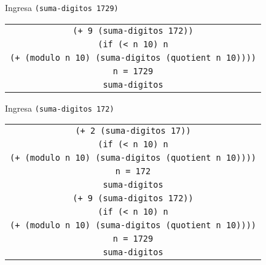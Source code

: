\documentclass[letterpaper,11pt]{article}
\begin{document}
\begin{enumerate}
\begin{enumerate}
        Ingresa \texttt{(suma-digitos 1729)}
        \begin{center}
            \begin{tabular}[h]{|c|}
                \hline
                \texttt{(+ 9 (suma-digitos 172))} \\
                \texttt{(if (< n 10) n} \\
                \texttt{(+ (modulo n 10) (suma-digitos (quotient n 10))))} \\ 
                \texttt{n = 1729} \\
                \texttt{suma-digitos} \\
                \hline
            \end{tabular}
        \end{center}

        Ingresa \texttt{(suma-digitos 172)}
        \begin{center}
            \begin{tabular}[h]{|c|}
                \hline
                \texttt{(+ 2 (suma-digitos 17))} \\
                \texttt{(if (< n 10) n} \\
                \texttt{(+ (modulo n 10) (suma-digitos (quotient n 10))))} \\ 
                \texttt{n = 172} \\
                \texttt{suma-digitos} \\
                \hline
                \hline
                \texttt{(+ 9 (suma-digitos 172))} \\
                \texttt{(if (< n 10) n} \\
                \texttt{(+ (modulo n 10) (suma-digitos (quotient n 10))))} \\ 
                \texttt{n = 1729} \\
                \texttt{suma-digitos} \\
                \hline
            \end{tabular}
        \end{center}


\end{enumerate}
\end{enumerate}
\end{document}
